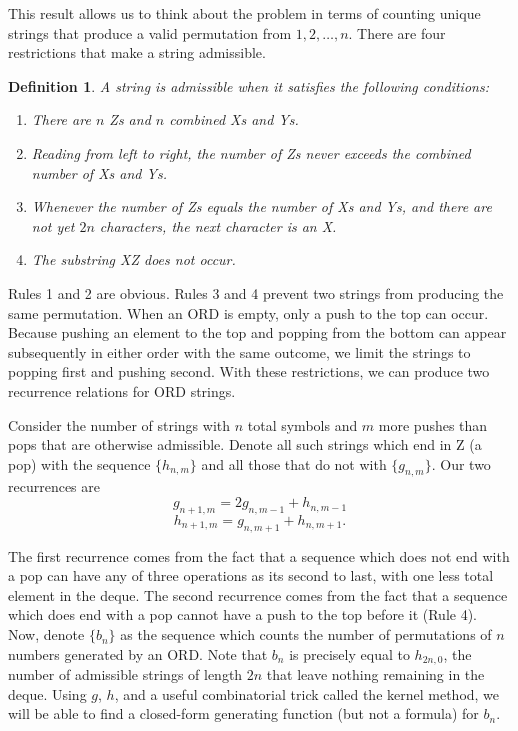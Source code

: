 \documentclass[12pt]{article}
\newtheorem{defn}{Definition} %
\begin{document}
This result allows us to think about the problem in terms of counting unique strings that produce a valid permutation from $1,2,\ldots,n$. There are four restrictions that make a string admissible. 

\begin{defn}
A string is admissible when it satisfies the following conditions:
\begin{enumerate}
    \item There are $n$ Zs and $n$ combined Xs and Ys.
    \item Reading from left to right, the number of Zs never exceeds the combined number of Xs and Ys.
    \item Whenever the number of Zs equals the number of Xs and Ys, and there are not yet $2n$ characters, the next character is an X.
    \item The substring XZ does not occur.
\end{enumerate}
\end{defn}

Rules 1 and 2 are obvious. Rules 3 and 4 prevent two strings from producing the same permutation. When an ORD is empty, only a push to the top can occur. Because pushing an element to the top and popping from the bottom can appear subsequently in either order with the same outcome, we limit the strings to popping first and pushing second. With these restrictions, we can produce two recurrence relations for ORD strings.

Consider the number of strings with $n$ total symbols and $m$ more pushes than pops that are otherwise admissible. Denote all such strings which end in Z (a pop) with the sequence $\{h_{n,m}\}$ and all those that do not with $\{g_{n,m}\}$. Our two recurrences are $$g_{n+1,m}=2g_{n,m-1}+h_{n,m-1}$$ $$h_{n+1,m}=g_{n,m+1}+h_{n,m+1}.$$

The first recurrence comes from the fact that a sequence which does not end with a pop can have any of three operations as its second to last, with one less total element in the deque. The second recurrence comes from the fact that a sequence which does end with a pop cannot have a push to the top before it (Rule 4). Now, denote $\{b_n\}$ as the sequence which counts the number of permutations of $n$ numbers generated by an ORD. Note that $b_n$ is precisely equal to $h_{2n,0}$, the number of admissible strings of length $2n$ that leave nothing remaining in the deque. Using $g$, $h$, and a useful combinatorial trick called the kernel method, we will be able to find a closed-form generating function (but not a formula) for $b_n$.
\end{document}

